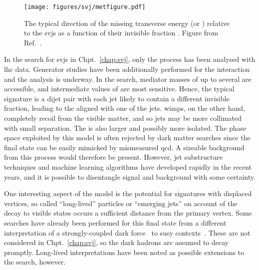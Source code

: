 \begin{figure}[htbp]
    \centering
    \texttt{[image: figures/svj/metfigure.pdf]}
    \caption[The typical direction of the missing transverse energy relative to the semi-visible jets as a function of the invisible fraction \rinv]{The typical direction of the missing transverse energy \ETslash\xspace (or \ptmiss) relative to the \glspl{svj} as a function of their invisible fraction \rinv. Figure from Ref.~.}
    \label{fig:theory_svj_met_dir}
\end{figure}

In the search for \glspl{svj} in Chpt.~\ref{chap:svj}, only the \schannel process has been analysed with \acrshort{lhc} data. Generator studies have been additionally performed for the \tchannel interaction and the analysis is underway. In the \schannel search, mediator masses of up to several \TeVns are accessible, and intermediate values of \rinv are most sensitive. Hence, the typical signature is a dijet pair with each \gls{jet} likely to contain a different invisible fraction, leading to the \ptvecmiss aligned with one of the \glspl{jet}. \glspl{wimp}, on the other hand, completely recoil from the visible matter, and so \glspl{jet} may be more collimated with small separation. The \ptmiss is also larger and possibly more isolated. The phase space exploited by this model is often rejected by dark matter searches since the final state can be easily mimicked by mismeasured \acrshort{qcd}. A sizeable background from this process would therefore be present. However, \gls{jet} substructure techniques and machine learning algorithms have developed rapidly in the recent years, and it is possible to disentangle signal and background with some certainty.

One interesting aspect of the model is the potential for signatures with displaced vertices, so called ``long-lived'' particles or ``emerging jets'' on account of the decay to visible states occurs a sufficient distance from the primary vertex. Some searches have already been performed for this final state from a different interpretation of a strongly-coupled dark force~\cite{Sirunyan:2018njd} to \acrlong{susy} contexts~\cite{SUS16038published}. These are not considered in Chpt.~\ref{chap:svj}, so the dark hadrons are assumed to decay promptly. Long-lived interpretations have been noted as possible extensions to the search, however.
